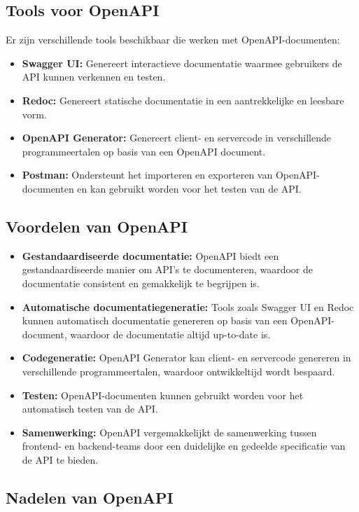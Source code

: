 \subsection{Tools voor OpenAPI}

Er zijn verschillende tools beschikbaar die werken met OpenAPI-documenten:

\begin{itemize}
  \item \textbf{Swagger UI:} Genereert interactieve documentatie waarmee gebruikers de API kunnen verkennen en testen.
  \item \textbf{Redoc:} Genereert statische documentatie in een aantrekkelijke en leesbare vorm.
  \item \textbf{OpenAPI Generator:} Genereert client- en servercode in verschillende programmeertalen op basis van een OpenAPI document.
  \item \textbf{Postman:} Ondersteunt het importeren en exporteren van OpenAPI-documenten en kan gebruikt worden voor het testen van de API.
\end{itemize}

\subsection{Voordelen van OpenAPI}

\begin{itemize}
  \item \textbf{Gestandaardiseerde documentatie:} OpenAPI biedt een gestandaardiseerde manier om API's te documenteren, waardoor de documentatie consistent en gemakkelijk te begrijpen is.
  \item \textbf{Automatische documentatiegeneratie:} Tools zoals Swagger UI en Redoc kunnen automatisch documentatie genereren op basis van een OpenAPI-document, waardoor de documentatie altijd up-to-date is.
  \item \textbf{Codegeneratie:} OpenAPI Generator kan client- en servercode genereren in verschillende programmeertalen, waardoor ontwikkeltijd wordt bespaard.
  \item \textbf{Testen:} OpenAPI-documenten kunnen gebruikt worden voor het automatisch testen van de API.
  \item \textbf{Samenwerking:} OpenAPI vergemakkelijkt de samenwerking tussen frontend- en backend-teams door een duidelijke en gedeelde specificatie van de API te bieden.
\end{itemize}

\subsection{Nadelen van OpenAPI}

